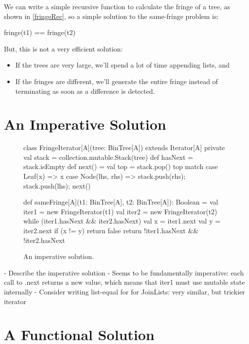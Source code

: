 \documentclass{book}
\begin{document}
We can write a simple recursive function to calculate the fringe of a tree,
as shown in \cref{fringeRec}, so a simple solution to the same-fringe problem
is:
\begin{scalacode}
fringe(t1) == fringe(t2)
\end{scalacode}

But, this is not a very efficient solution:
\begin{itemize}

  \item If the trees are very large, we'll spend a lot of time appending
  lists, and

  \item If the fringes are different, we'll generate the entire fringe instead
  of terminating as soon as a difference is detected.

\end{itemize}

\section{An Imperative Solution}

\begin{figure}
\begin{scalacode}
class FringeIterator[A](tree: BinTree[A]) extends Iterator[A] {
  private val stack = collection.mutable.Stack(tree)
  def hasNext = stack.isEmpty
  def next() = {
    val top = stack.pop()
    top match {
      case Leaf(x) => x
      case Node(lhs, rhs) => { stack.push(rhs); stack.push(lhs); next() }
    }
  }
}

def sameFringe[A](t1: BinTree[A], t2: BinTree[A]): Boolean = {
  val iter1 = new FringeIterator(t1)
  val iter2 = new FringeIterator(t2)
  while (iter1.hasNext && iter2.hasNext) {
    val x = iter1.next
    val y = iter2.next
    if (x != y) {
      return false
    }
  }
  return !iter1.hasNext && !iter2.hasNext
}
\end{scalacode}
\caption{An imperative solution.}
\label{samefringe_imperative}
\end{figure}

- Describe the imperative solution
- Seems to be fundamentally imperative: each call to .next returns a new value,
  which means that iter1 must use mutable state internally
- Consider writing list-equal for for JoinLists: very similar, but trickier
  iterator


\section{A Functional Solution}
\end{document}
